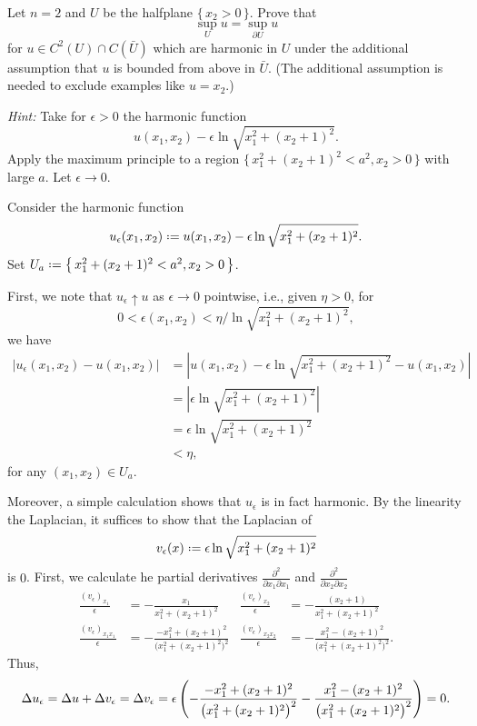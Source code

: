 \begin{problem}
  Let \(n=2\) and \(U\) be the halfplane \(\{\,x_2>0\,\}\). Prove that
  \[
    \sup_U u=\sup_{\partial U}u
  \]
  for \(u\in C^2(U)\cap C(\bar U)\) which are harmonic in \(U\) under the
  additional assumption that \(u\) is bounded from above in \(\bar
  U\). (The additional assumption is needed to exclude examples like
  \(u=x_2\).)

  \noindent\emph{Hint:} Take for \(\epsilon>0\) the harmonic function
  \[
    u(x_1,x_2)-\epsilon\ln\sqrt{x_1^2+(x_2+1)^2}.
  \]
  Apply the maximum principle to a region
  \(\bigl\{\,x_1^2+(x_2+1)^2<a^2,x_2>0\,\bigr\}\) with large \(a\). Let
  \(\epsilon\to 0\).
\end{problem}
\begin{solution*}
  Consider the harmonic function
  \[
    u_\epsilon(x_1,x_2)\defeq
    u(x_1,x_2)-\epsilon\ln\sqrt{x_1^2+(x_2+1)^2}.
  \]
  Set \(U_a\defeq \bigl\{\,x_1^2+(x_2+1)^2<a^2,x_2>0\,\bigr\}\).

  First, we note that \(u_\epsilon\uparrow u\) as \(\epsilon\to 0\)
  pointwise, i.e., given \(\eta>0\), for
  \[
    0<\epsilon(x_1,x_2)<\eta/{\ln\sqrt{x_1^2+(x_2+1)^2}},
  \]
  we have
  \begin{align*}
    |u_\epsilon(x_1,x_2)-u(x_1,x_2)|
    &=\left|
      u(x_1,x_2)-\epsilon\ln\sqrt{x_1^2+(x_2+1)^2}
      -u(x_1,x_2)
      \right|\\
    &=\left|
      \epsilon\ln\sqrt{x_1^2+(x_2+1)^2}
      \right|\\
    &=\epsilon\ln\sqrt{x_1^2+(x_2+1)^2}\\
    &<\eta,
  \end{align*}
  for any \((x_1,x_2)\in U_a\).

  Moreover, a simple calculation shows that \(u_\epsilon\) is in fact
  harmonic. By the linearity the Laplacian, it suffices to show that the
  Laplacian of
  \[
    v_\epsilon(x)\defeq\epsilon\ln\sqrt{x_1^2+(x_2+1)^2}%
  \]
  is \(0\). First, we calculate he partial derivatives
  \(\frac{\partial^2}{\partial x_1\partial x_1}\) and
  \(\frac{\partial^2}{\partial x_2\partial x_2}\)
  \begin{align*}
   \frac{(v_\epsilon)_{x_1}}{\epsilon}
    &=-\frac{x_1}{x_1^2+(x_2+1)^2}
    &\frac{(v_\epsilon)_{x_2}}{\epsilon}
    &=-\frac{(x_2+1)}{x_1^2+(x_2+1)^2}\\
    \frac{(v_{\epsilon})_{x_1x_1}}{\epsilon}
    &=-\frac{-x_1^2+(x_2+1)^2}{\bigl(x_1^2+(x_2+1)^2\bigr)^2}
    &\frac{(v_{\epsilon})_{x_2x_2}}{\epsilon}
    &=-\frac{x_1^2-(x_2+1)^2}{\bigl(x_1^2+(x_2+1)^2\bigr)^2}.
  \end{align*}
  Thus,
  \[
    \Lap u_\epsilon=\Lap u+\Lap v_\epsilon=
    \Lap v_\epsilon=\epsilon
    \left(
      -\frac{-x_1^2+(x_2+1)^2}{\bigl(x_1^2+(x_2+1)^2\bigr)^2}
      -\frac{x_1^2-(x_2+1)^2}{\bigl(x_1^2+(x_2+1)^2\bigr)^2}
    \right)=0.
  \]


\end{solution*}
